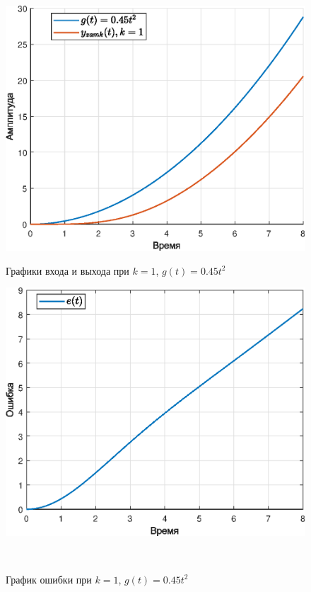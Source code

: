 \documentclass[a4paper]{article}
\begin{document}
\begin{figure}[H]
    \begin{minipage}{0.5\textwidth}
        \centering \includegraphics[width=\textwidth]{ex4/k1_g_at2.eps}
        \caption{Графики входа и выхода при $k=1$, $g(t)=0.45t^2$}
    \end{minipage}\hfill
    \begin{minipage}{0.5\textwidth}
        \centering \includegraphics[width=\textwidth]{ex4/k1_g_at2_error.eps}
        \caption{График ошибки при $k=1$, $g(t)=0.45t^2$}
    \end{minipage}\\[1em]
\end{figure}\noindent\
\end{document}
